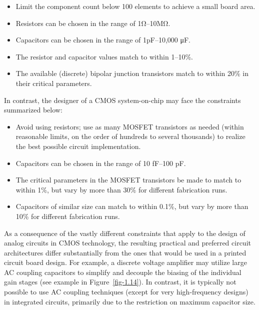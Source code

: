 \documentclass[
  11pt,
  letterpaper,
  abstract]{scrbook}
\begin{document}
\begin{itemize}
\item
  Limit the component count below 100 elements to achieve a small board
  area.
\item
  Resistors can be chosen in the range of 1Ω--10MΩ.
\item
  Capacitors can be chosen in the range of 1pF--10,000 μF.
\item
  The resistor and capacitor values match to within 1--10\%.
\item
  The available (discrete) bipolar junction transistors match to within
  20\% in their critical parameters.
\end{itemize}

In contrast, the designer of a CMOS system-on-chip may face the
constraints summarized below:

\begin{itemize}
\item
  Avoid using resistors; use as many MOSFET transistors as needed
  (within reasonable limits, on the order of hundreds to several
  thousands) to realize the best possible circuit implementation.
\item
  Capacitors can be chosen in the range of 10 fF--100 pF.
\item
  The critical parameters in the MOSFET transistors be made to match to
  within 1\%, but vary by more than 30\% for different fabrication runs.
\item
  Capacitors of similar size can match to within 0.1\%, but vary by more
  than 10\% for different fabrication runs.
\end{itemize}

As a consequence of the vastly different constraints that apply to the
design of analog circuits in CMOS technology, the resulting practical
and preferred circuit architectures differ substantially from the ones
that would be used in a printed circuit board design. For example, a
discrete voltage amplifier may utilize large AC coupling capacitors to
simplify and decouple the biasing of the individual gain stages (see
example in Figure~\ref{fig-1.14}). In contrast, it is typically not
possible to use AC coupling techniques (except for very high-frequency
designs) in integrated circuits, primarily due to the restriction on
maximum capacitor size.
\end{document}
